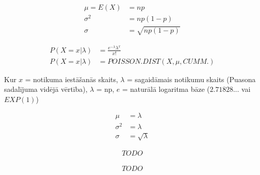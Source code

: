{\begin{align*}
    \mu = E(X) &= np \\
    \sigma^2 &= np(1-p) \\
    \sigma &= \sqrt{np(1-p)}
\end{align*}}


{\begin{align*}
    P(X=x|\lambda) &= \displaystyle\frac{e^{-\lambda}\lambda^x}{x!} \\
    P(X=x|\lambda) &= POISSON.DIST(X, \mu, CUMM.) 
\end{align*}

Kur $x$ = notikuma iestāšanās skaits, $\lambda$ = sagaidāmais notikumu skaits
(Puasona sadalījuma vidējā vērtība), $\lambda$ = np, $e$ = naturālā logaritma
bāze ($2.71828...$ vai $EXP(1)$)
}
{\begin{align*}
    \mu &= \lambda \\
    \sigma^2 &= \lambda \\
    \sigma &= \sqrt{\lambda}
\end{align*}
}

{\begin{align*}
    TODO 
\end{align*}}

{\begin{align*}
    TODO 
\end{align*}}
